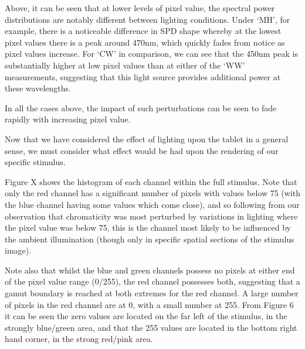 
Above, it can be seen that at lower levels of pixel value, the spectral power distributions are notably different between lighting conditions. Under `MH', for example, there is a noticeable difference in \gls{SPD} shape whereby at the lowest pixel values there is a peak around 470nm, which quickly fades from notice as pixel values increase. For `CW' in comparison, we can see that the 450nm peak is substantially higher at low pixel values than at either of the `WW' measurements, suggesting that this light source provides additional power at these wavelengths.

In all the cases above, the impact of such perturbations can be seen to fade rapidly with increasing pixel value.

Now that we have considered the effect of lighting upon the tablet in a general sense, we must consider what effect would be had upon the rendering of our specific stimulus.


Figure X %
shows the histogram of each channel within the full stimulus. Note that only the red channel has a significant number of pixels with values below 75 (with the blue channel having some values which come close), and so following from our observation that chromaticity was most perturbed by variations in lighting where the pixel value was below 75, this is the channel most likely to be influenced by the ambient illumination (though only in specific spatial sections of the stimulus image).

Note also that whilst the blue and green channels possess no pixels at either end of the pixel value range (0/255), the red channel possesses both, suggesting that a gamut boundary is reached at both extremes for the red channel. A large number of pixels in the red channel are at 0, with a small number at 255. From Figure 6 it can be seen the zero values are located on the far left of the stimulus, in the strongly blue/green area, and that the 255 values are located in the bottom right hand corner, in the strong red/pink area.



